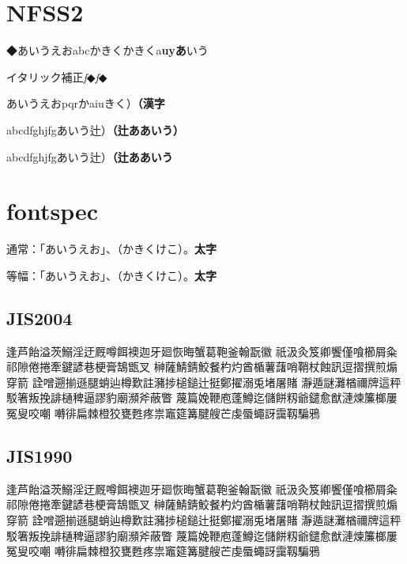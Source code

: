 \documentclass{article}
\begin{document}
\section{NFSS2}

◆あいうえおabcかきく{\gt かきくa{\bf uyあ}いう}

{イタリック補正\textit{f}◆{\it f\/}◆\par}

あいうえおpqr{\dr かaiu}きく）{\bf （漢字}

{abcdfghjfgあいう辻）\textbf{（辻あ{\Large あ}いう）}}

{abcdfghjfgあいう辻）\textbf{\unkern（辻あ{\Large あ}いう}}









\section{fontspec}

\setmainfont{TeXGyreTermes}
\setsansfont{TeXGyreHeros}


\newjfontfamily{}

通常：「あいうえお」、（かきくけこ）。{\bf 太字}

{
\noindent 等幅：「あいうえお」、（かきくけこ）。{\bf 太字}
}

\subsection{JIS2004}
逢芦飴溢茨鰯淫迂厩噂餌襖迦牙廻恢晦蟹葛鞄釜翰翫徽
祇汲灸笈卿饗僅喰櫛屑粂祁隙倦捲牽鍵諺巷梗膏鵠甑叉
榊薩鯖錆鮫餐杓灼酋楯薯藷哨鞘杖蝕訊逗摺撰煎煽穿箭
詮噌遡揃遜腿蛸辿樽歎註瀦捗槌鎚辻挺鄭擢溺兎堵屠賭
瀞遁謎灘楢禰牌這秤駁箸叛挽誹樋稗逼謬豹廟瀕斧蔽瞥
蔑篇娩鞭庖蓬鱒迄儲餅籾爺鑓愈猷漣煉簾榔屢冤叟咬嘲
囀徘扁棘橙狡甕甦疼祟竈筵篝腱艘芒虔蜃蠅訝靄靱騙鴉

\subsection{JIS1990}
{\ipajisninety
逢芦飴溢茨鰯淫迂厩噂餌襖迦牙廻恢晦蟹葛鞄釜翰翫徽
祇汲灸笈卿饗僅喰櫛屑粂祁隙倦捲牽鍵諺巷梗膏鵠甑叉
榊薩鯖錆鮫餐杓灼酋楯薯藷哨鞘杖蝕訊逗摺撰煎煽穿箭
詮噌遡揃遜腿蛸辿樽歎註瀦捗槌鎚辻挺鄭擢溺兎堵屠賭
瀞遁謎灘楢禰牌這秤駁箸叛挽誹樋稗逼謬豹廟瀕斧蔽瞥
蔑篇娩鞭庖蓬鱒迄儲餅籾爺鑓愈猷漣煉簾榔屢冤叟咬嘲
囀徘扁棘橙狡甕甦疼祟竈筵篝腱艘芒虔蜃蠅訝靄靱騙鴉
}
\end{document}
